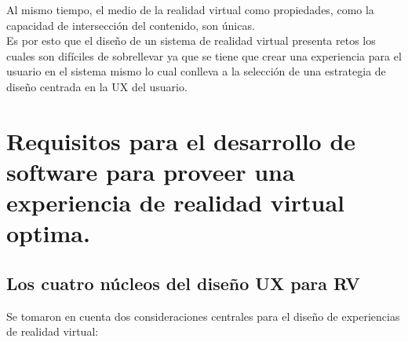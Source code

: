 Al mismo tiempo, el medio de la realidad virtual como propiedades, como la capacidad de intersección del contenido, son únicas.\\

Es por esto que el diseño de un sistema de realidad virtual presenta retos los cuales son difíciles de sobrellevar ya que se tiene que crear una experiencia para el usuario en el sistema mismo lo cual conlleva a la selección de una estrategia de diseño centrada en la UX del usuario.\\

\section{Requisitos para el desarrollo de software para proveer una experiencia de realidad virtual optima.}
\subsection{Los cuatro núcleos del diseño UX para RV}
Se tomaron en cuenta dos consideraciones centrales para el diseño de experiencias de realidad virtual:

